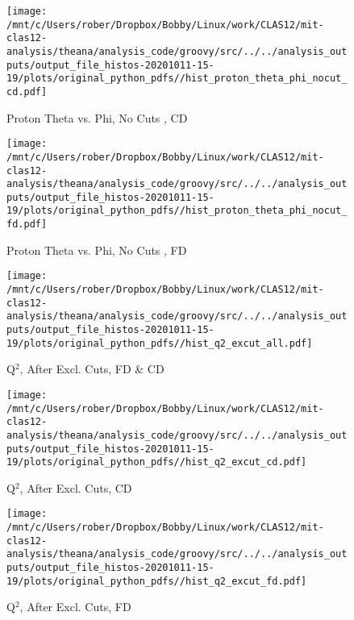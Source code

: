 \documentclass{article}
\begin{document}
\begin{landscape}
\begin{figure}[h]
        \texttt{[image: /mnt/c/Users/rober/Dropbox/Bobby/Linux/work/CLAS12/mit-clas12-analysis/theana/analysis\_code/groovy/src/../../analysis\_outputs/output\_file\_histos-20201011-15-19/plots/original\_python\_pdfs//hist\_proton\_theta\_phi\_nocut\_cd.pdf]}
        \captionsetup{textformat=empty,labelformat=blank}
        \caption{Proton Theta vs. Phi, No Cuts , CD}
    \end{figure}
    \clearpage
    
    \begin{figure}[h]
        \centering

        \texttt{[image: /mnt/c/Users/rober/Dropbox/Bobby/Linux/work/CLAS12/mit-clas12-analysis/theana/analysis\_code/groovy/src/../../analysis\_outputs/output\_file\_histos-20201011-15-19/plots/original\_python\_pdfs//hist\_proton\_theta\_phi\_nocut\_fd.pdf]}
        \captionsetup{textformat=empty,labelformat=blank}
        \caption{Proton Theta vs. Phi, No Cuts , FD}
    \end{figure}
    \clearpage
    
    \begin{figure}[h]
        \centering

        \texttt{[image: /mnt/c/Users/rober/Dropbox/Bobby/Linux/work/CLAS12/mit-clas12-analysis/theana/analysis\_code/groovy/src/../../analysis\_outputs/output\_file\_histos-20201011-15-19/plots/original\_python\_pdfs//hist\_q2\_excut\_all.pdf]}
        \captionsetup{textformat=empty,labelformat=blank}
        \caption{Q$^{2}$, After Excl. Cuts, FD \& CD}
    \end{figure}
    \clearpage
    
    \begin{figure}[h]
        \centering

        \texttt{[image: /mnt/c/Users/rober/Dropbox/Bobby/Linux/work/CLAS12/mit-clas12-analysis/theana/analysis\_code/groovy/src/../../analysis\_outputs/output\_file\_histos-20201011-15-19/plots/original\_python\_pdfs//hist\_q2\_excut\_cd.pdf]}
        \captionsetup{textformat=empty,labelformat=blank}
        \caption{Q$^{2}$, After Excl. Cuts, CD}
    \end{figure}
    \clearpage
    
    \begin{figure}[h]
        \centering

        \texttt{[image: /mnt/c/Users/rober/Dropbox/Bobby/Linux/work/CLAS12/mit-clas12-analysis/theana/analysis\_code/groovy/src/../../analysis\_outputs/output\_file\_histos-20201011-15-19/plots/original\_python\_pdfs//hist\_q2\_excut\_fd.pdf]}
        \captionsetup{textformat=empty,labelformat=blank}
        \caption{Q$^{2}$, After Excl. Cuts, FD}
    \end{figure}
    \clearpage
    

\end{landscape}
\end{document}
